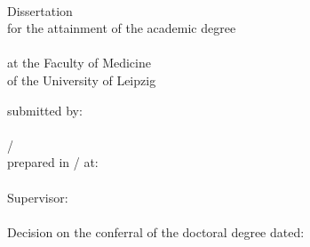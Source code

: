 
\clearpage
\thispagestyle{empty}

\begin{titlepage}
\begin{center}

\null
\vspace{3\baselineskip}
\large{\tTitle} \\
\vspace{3\baselineskip}
Dissertation \\
for the attainment of the academic degree \\
\tDegree \\
\vspace{\baselineskip}
at the Faculty of Medicine \\
of the University of Leipzig \\
\vspace{6\baselineskip}
\end{center}

\vfill

\noindent
submitted by: \\
\tAuthor \\
\tBirthday / \tNativeTown \\

\noindent
prepared in / at: \\
\tDepartment \\

\noindent
Supervisor: \\
\tSupervisor \\

\noindent
Decision on the conferral of the doctoral degree dated: \\
\tDefenceDate

\end{titlepage}
